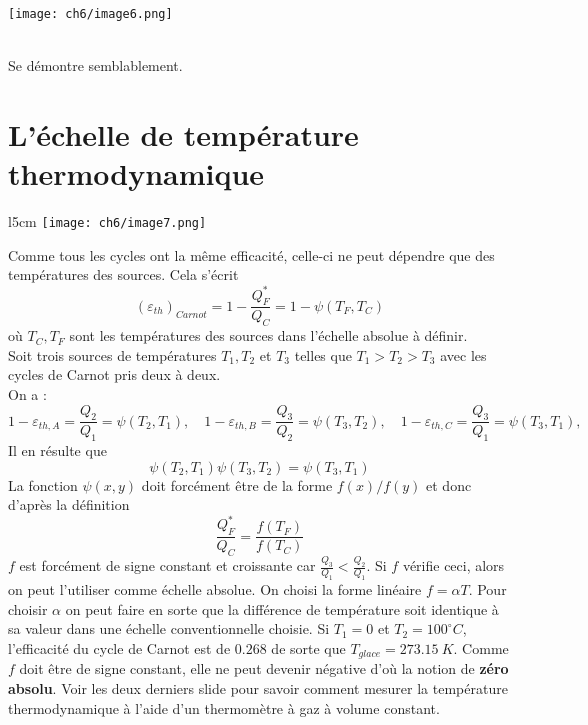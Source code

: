 	\begin{center}
	\texttt{[image: ch6/image6.png]}
	\end{center}
	
	\ \\
	Se démontre semblablement.
	
	
	\section{L'échelle de température thermodynamique}
		\begin{wrapfigure}[10]{l}{5cm}
	\vspace{-5mm}
	\texttt{[image: ch6/image7.png]}
	\end{wrapfigure}
	Comme tous les cycles ont la même efficacité, celle-ci ne peut 
	dépendre que des températures des sources. Cela s'écrit 
	\begin{equation}
	(\varepsilon_{th})_{Carnot} = 1-\frac{Q_F^*}{Q_C} = 1 - 
	\psi(T_F,T_C)
	\end{equation}
	où $T_C,T_F$ sont les températures des sources dans l'échelle 
	absolue à définir.\\
	Soit trois sources de températures $T_1,T_2$ et $T_3$ telles que 
	$T_1 > T_2 > T_3$ avec les cycles de Carnot pris deux à deux.\\
	On a :\vspace{3mm}
	\begin{equation}
	1-\varepsilon_{th,A} = \frac{Q_2}{Q_1} = \psi(T_2,T_1),\quad 
	1-\varepsilon_{th,B} = \frac{Q_3}{Q_2} = \psi(T_3,T_2),\quad 
	1-\varepsilon_{th,C} = \frac{Q_3}{Q_1} = \psi(T_3,T_1),\quad 
	\end{equation}
	Il en résulte que
	\begin{equation}
	\psi(T_2,T_1)\psi(T_3,T_2) = \psi(T_3,T_1)
	\end{equation}
	La fonction $\psi(x,y)$ doit forcément être de la forme $f(x)/
	f(y)$ et donc d'après la définition
	\begin{equation}
	\frac{Q_F^*}{Q_C} = \frac{f(T_F)}{f(T_C)}
	\end{equation}
	$f$ est forcément de signe constant et croissante car $\frac{Q_3}{
	Q_1}<\frac{Q_2}{Q_1}$. Si $f$ vérifie ceci, alors on peut l'utiliser 
	comme échelle absolue. On choisi la forme linéaire $f = \alpha T$. 
	Pour choisir $\alpha$ on peut faire en sorte que la différence de 
	température soit identique à sa valeur dans une échelle conventionnelle 
	choisie. Si $T_1=0$ et $T_2=100^\circ C$, l'efficacité du cycle de 
	Carnot est de $0.268$ de sorte que $T_{glace} = 273.15\ K$. Comme $f$
	doit être de signe constant, elle ne peut devenir négative d'où la 
	notion de \textbf{zéro absolu}. Voir les deux derniers slide pour savoir 
	comment mesurer la température thermodynamique à l'aide d'un thermomètre 
	à gaz à volume constant.